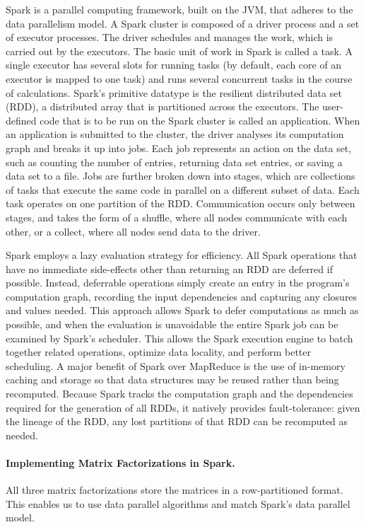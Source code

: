Spark is a parallel computing framework, built on the JVM, that adheres to the data parallelism model. A Spark cluster is composed of a driver process and a set of executor processes. The driver schedules and manages the work, which is carried out by the executors. The basic unit of work in Spark is called a task. A single executor has several slots for running tasks (by default, each core of an executor is mapped to one task) and runs several concurrent tasks in the course of calculations. Spark's primitive datatype is the resilient distributed data set (RDD), a distributed array that is partitioned across the executors. The user-defined code that is to be run on the Spark cluster is called an application. When an application is submitted to the cluster, the driver analyses its computation graph and breaks it up into jobs.  Each job represents an action on the data set, such as counting the number of entries, returning data set entries, or saving a data set to a file. Jobs are further broken down into stages, which are collections of tasks that execute the same code in parallel on a different subset of data. Each task operates on one partition of the RDD. Communication occurs only between stages, and takes the form of a shuffle, where all nodes communicate with each other, or a collect, where all nodes send data to the driver.

Spark employs a lazy evaluation strategy for efficiency. All Spark operations that have no immediate side-effects other than returning an RDD are deferred if possible. Instead, deferrable operations simply create an entry in the program's computation graph, recording the input dependencies and capturing any closures and values needed. This approach allows Spark to defer computations as much as possible, and when the evaluation is unavoidable the entire Spark job can be examined by Spark's scheduler. This allows the Spark execution engine to batch together related operations, optimize data locality, and perform better scheduling. A major benefit of Spark over MapReduce is the use of in-memory caching and storage so that data structures may be reused rather than being recomputed. Because Spark tracks the computation graph and the dependencies required for the generation of all RDDs, it natively provides fault-tolerance: given the lineage of the RDD, any lost partitions of that RDD can be recomputed as needed.

\paragraph{Implementing Matrix Factorizations in Spark.}
All three matrix factorizations store the matrices in a row-partitioned format. This enables us to use data parallel algorithms and match Spark's data parallel model.

